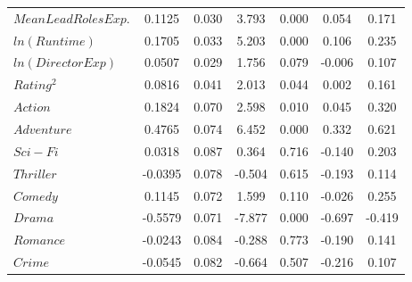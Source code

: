 \begin{table}[H]
\begin{center}
\begin{tabular}{lcccccc}
                        \textbf{$Mean Lead Roles Exp.$} & 0.1125        & 0.030            & 3.793      & 0.000               & 0.054           & 0.171           \\
                        \textbf{$ln(Runtime)$}          & 0.1705        & 0.033            & 5.203      & 0.000               & 0.106           & 0.235           \\
                        \textbf{$ln(Director Exp)$}     & 0.0507        & 0.029            & 1.756      & 0.079               & -0.006          & 0.107           \\
                        \textbf{$Rating^2$}             & 0.0816        & 0.041            & 2.013      & 0.044               & 0.002           & 0.161           \\
                        \textbf{$Action$}               & 0.1824        & 0.070            & 2.598      & 0.010               & 0.045           & 0.320           \\
                        \textbf{$Adventure$}            & 0.4765        & 0.074            & 6.452      & 0.000               & 0.332           & 0.621           \\
                        \textbf{$Sci-Fi$}               & 0.0318        & 0.087            & 0.364      & 0.716               & -0.140          & 0.203           \\
                        \textbf{$Thriller$}             & -0.0395       & 0.078            & -0.504     & 0.615               & -0.193          & 0.114           \\
                        \textbf{$Comedy$}               & 0.1145        & 0.072            & 1.599      & 0.110               & -0.026          & 0.255           \\
                        \textbf{$Drama$}                & -0.5579       & 0.071            & -7.877     & 0.000               & -0.697          & -0.419          \\
                        \textbf{$Romance$}              & -0.0243       & 0.084            & -0.288     & 0.773               & -0.190          & 0.141           \\
                        \textbf{$Crime$}                & -0.0545       & 0.082            & -0.664     & 0.507               & -0.216          & 0.107           \\
                        \bottomrule
                    \end{tabular}
                    \begin{tabular}{lclc}

\end{tabular}
\end{center}
\end{table}
